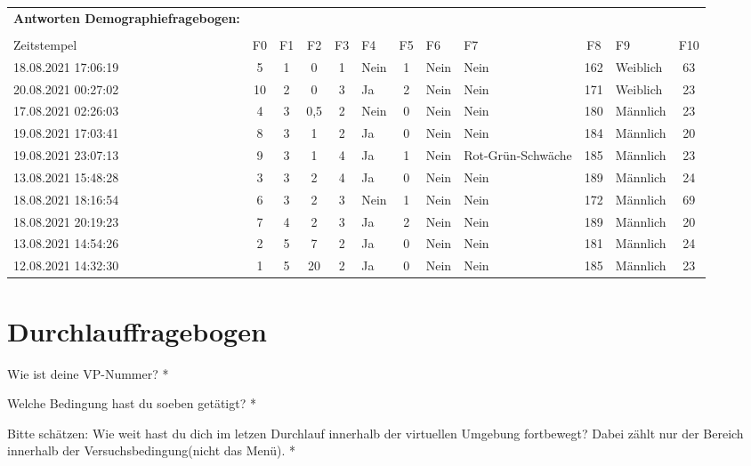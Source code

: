 \begin{landscape}
    \label{anhang:demo-antworten}
\begin{table}[]
\centering
\begin{tabular}{lcccclcllclc}
\textbf{Antworten Demographiefragebogen:} \\ \\
Zeitstempel         & F0 & F1 & F2  & F3 & F4   & F5                                     & F6   & F7                & F8  & F9       & F10 \\
18.08.2021 17:06:19 & 5  & 1  & 0   & 1  & Nein & 1 & Nein & Nein              & 162 & Weiblich & 63  \\
20.08.2021 00:27:02 & 10 & 2  & 0   & 3  & Ja   & 2 & Nein & Nein              & 171 & Weiblich & 23  \\
17.08.2021 02:26:03 & 4  & 3  & 0,5 & 2  & Nein & 0 & Nein & Nein              & 180 & Männlich & 23  \\
19.08.2021 17:03:41 & 8  & 3  & 1   & 2  & Ja   & 0 & Nein & Nein              & 184 & Männlich & 20  \\
19.08.2021 23:07:13 & 9  & 3  & 1   & 4  & Ja   & 1 & Nein & Rot-Grün-Schwäche & 185 & Männlich & 23  \\
13.08.2021 15:48:28 & 3  & 3  & 2   & 4  & Ja   & 0 & Nein & Nein              & 189 & Männlich & 24  \\
18.08.2021 18:16:54 & 6  & 3  & 2   & 3  & Nein & 1 & Nein & Nein              & 172 & Männlich & 69  \\
18.08.2021 20:19:23 & 7  & 4  & 2   & 3  & Ja   & 2 & Nein & Nein              & 189 & Männlich & 20  \\
13.08.2021 14:54:26 & 2  & 5  & 7   & 2  & Ja   & 0 & Nein & Nein              & 181 & Männlich & 24  \\
12.08.2021 14:32:30 & 1  & 5  & 20  & 2  & Ja   & 0 & Nein & Nein              & 185 & Männlich & 23
\end{tabular}
\end{table}
\end{landscape}

\section*{Durchlauffragebogen}
\label{anhang:durchlauf}
Wie ist deine VP-Nummer? *

Welche Bedingung hast du soeben getätigt? *

Bitte schätzen: Wie weit hast du dich im letzen Durchlauf innerhalb der virtuellen Umgebung fortbewegt? Dabei zählt nur der Bereich innerhalb der Versuchsbedingung(nicht das Menü). *

